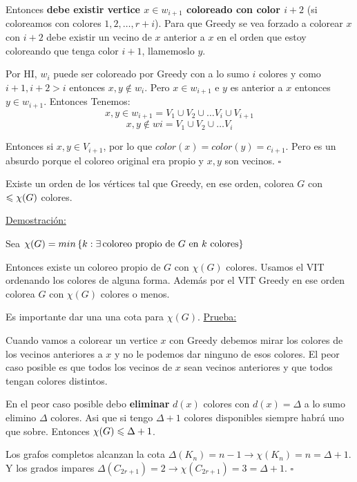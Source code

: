 \documentclass[12pt,a4paper]{article}
\begin{document}
Entonces \textbf{debe existir vertice $x \in w_{i+1}$ coloreado con color $i+2$} (si coloreamos 
con colores $1,2,\ldots,r+i$). Para que Greedy se vea forzado a colorear $x$ con 
$i+2$ debe existir un vecino de $x$ anterior a $x$ en el orden que estoy coloreando 
que tenga color $i+1$, llamemoslo $y$.
\medskip

Por HI, $w_{i}$ puede ser coloreado por Greedy con a lo sumo $i$ colores y como 
$i+1, i+2 > i$ entonces $x,y \notin w_{i}$. Pero $x \in w_{i+1}$ e $y$ es anterior 
a $x$ entonces $y \in w_{i+1}$. Entonces Tenemos:
$$x,y \in w_{i+1} = V_{1} \cup V_{2} \cup \ldots V_{i} \cup V_{i+1}$$
$$x,y \notin w{i} = V_{1} \cup V_{2} \cup \ldots V_{i}$$

Entonces si $x,y \in V_{i+1}$, por lo que $color(x)=color(y)=c_{i+1}$. Pero es un 
absurdo porque el coloreo original era propio y $x,y$ son vecinos.
$\square$

\begin{corolario} Existe un orden de los vértices tal que Greedy, en ese orden, 
    colorea $G$ con $\leqslant \chi(G)$ colores.
\end{corolario}

\underline{Demostración:} 
\medskip

Sea $\chi(G) = min\left\lbrace k: \exists\, \text{coloreo propio de $G$ en $k$ colores} \right\rbrace$
\medskip

Entonces existe un coloreo propio de $G$ con $\chi(G)$ colores. Usamos el VIT 
ordenando los colores de alguna forma. Además por el VIT Greedy en ese orden colorea 
$G$ con $\chi(G)$ colores o menos.
\medskip

Es importante dar una una cota para $\chi(G)$. \underline{Prueba:}
\medskip

Cuando vamos a colorear un vertice $x$ con Greedy debemos mirar los colores de 
los vecinos anteriores a $x$ y no le podemos dar ninguno de esos colores. El peor 
caso posible es que todos los vecinos de $x$ sean vecinos anteriores y que todos 
tengan colores distintos.
\medskip

En el peor caso posible debo \textbf{eliminar} $d(x)$ colores con $d(x) = \Delta$ 
a lo sumo elimino $\Delta$ colores. Asi que si tengo $\Delta +1$ colores disponibles 
siempre habrá uno que sobre. Entonces $\chi(G) \leqslant \Delta + 1$. 
\medskip

Los grafos completos alcanzan la cota $\Delta(K_{n}) = n-1 \rightarrow \chi(K_{n}) = n = \Delta +1$.
Y los grados impares $\Delta(C_{2r+1}) = 2 \rightarrow \chi(C_{2r+1}) = 3 = \Delta +1$.
$\square$
\end{document}
